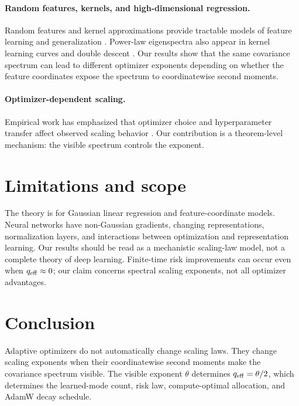 \documentclass{article}
\begin{document}
\paragraph{Random features, kernels, and high-dimensional regression.} Random features and kernel approximations provide tractable models of feature learning and generalization \citep{rahimi2007random,rudi2017generalization,bach2017breaking,jacot2018neural}.  Power-law eigenspectra also appear in kernel learning curves and double descent \citep{belkin2019reconciling,hastie2022surprises,bartlett2020benign}.  Our results show that the same covariance spectrum can lead to different optimizer exponents depending on whether the feature coordinates expose the spectrum to coordinatewise second moments.

\paragraph{Optimizer-dependent scaling.} Empirical work has emphasized that optimizer choice and hyperparameter transfer affect observed scaling behavior \citep{mccandlish2018empirical,smith2018bayesian,ramani2026optimizer}.  Our contribution is a theorem-level mechanism: the visible spectrum controls the exponent.

\section{Limitations and scope}
The theory is for Gaussian linear regression and feature-coordinate models.  Neural networks have non-Gaussian gradients, changing representations, normalization layers, and interactions between optimization and representation learning.  Our results should be read as a mechanistic scaling-law model, not a complete theory of deep learning.  Finite-time risk improvements can occur even when $q_{\rm eff}\approx0$; our claim concerns spectral scaling exponents, not all optimizer advantages.

\section{Conclusion}
Adaptive optimizers do not automatically change scaling laws.  They change scaling exponents when their coordinatewise second moments make the covariance spectrum visible.  The visible exponent $\theta$ determines $q_{\rm eff}=\theta/2$, which determines the learned-mode count, risk law, compute-optimal allocation, and AdamW decay schedule.
\end{document}
